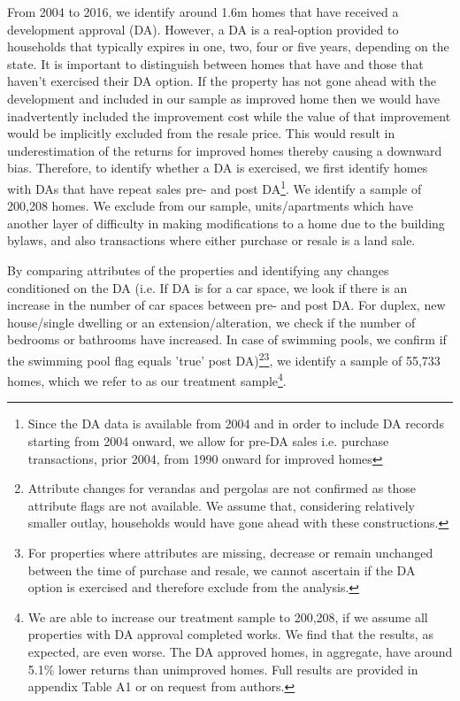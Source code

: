 \documentclass[AEJ,reqno, draftmode]{AEA} %
\begin{document}
From 2004 to 2016, we identify around 1.6m homes that have received a development approval (DA). However, a DA is a real-option provided to households that typically expires in one, two, four or five years, depending on the state. It is important to distinguish between homes that have and those that haven't exercised their DA option. If the property has not gone ahead with the development and included in our sample as improved home then we would have inadvertently included the improvement cost while the value of that improvement would be implicitly excluded from the resale price. This would result in underestimation of the returns for improved homes thereby causing a downward bias. Therefore, to identify whether a DA is exercised, we first identify homes with DAs that have repeat sales pre- and post DA\footnote{Since the DA data is available from 2004 and in order to include DA records starting from 2004 onward, we allow for pre-DA sales i.e. purchase transactions, prior 2004, from 1990 onward for improved homes}. We identify a sample of 200,208 homes. We exclude from our sample, units/apartments which have another layer of difficulty in making modifications to a home due to the building bylaws, and also transactions where either purchase or resale is a land sale. 


By comparing attributes of the properties and identifying any changes conditioned on the DA (i.e. If DA is for a car space, we look if there is an increase in the number of car spaces between pre- and post DA. For duplex, new house/single dwelling or an extension/alteration, we check if the number of bedrooms or bathrooms have increased. In case of swimming pools, we confirm if the swimming pool flag equals 'true' post DA)\footnote{Attribute changes for verandas and pergolas are not confirmed as those attribute flags are not available. We assume that, considering relatively smaller outlay, households would have gone ahead with these constructions.}\footnote{For properties where attributes are missing, decrease or remain unchanged between the time of purchase and resale, we cannot ascertain if the DA option is exercised and therefore exclude from the analysis.}, we identify a sample of 55,733 homes, which we refer to as our treatment sample\footnote{We are able to increase our treatment sample to 200,208, if we assume all properties with DA approval completed works. We find that the results, as expected, are even worse. The DA approved homes, in aggregate, have around 5.1\% lower returns than unimproved homes. Full results are provided in appendix Table A1 or on request from authors.}. 
\end{document}
